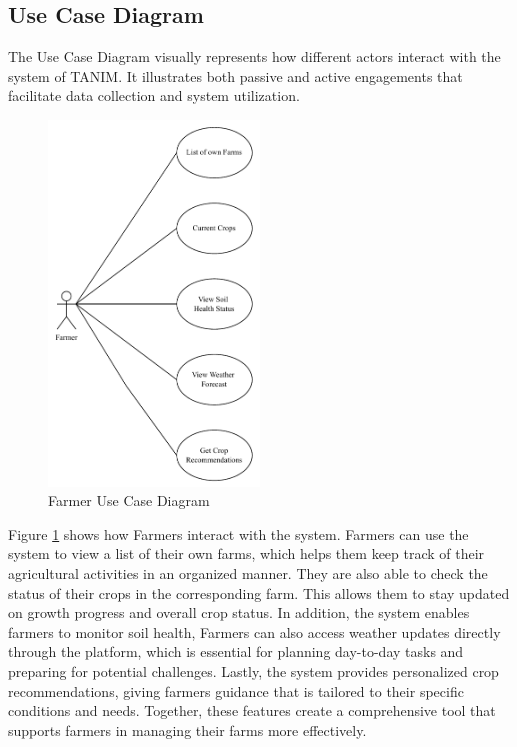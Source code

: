 {	\subsection{Use Case Diagram}
	The Use Case Diagram visually represents how different actors interact with the system of TANIM. It illustrates both passive and active engagements that facilitate data collection and system utilization.
	
	\begin{figure}[H]
		\centering
		\caption{Farmer Use Case Diagram}
		\label{fig:FarmerUseCase}
		\includegraphics[width=0.5\textwidth]{figures/FarmerUseCase.pdf}
	\end{figure}
	
	Figure \ref{fig:FarmerUseCase} shows how Farmers interact with the system. Farmers can use the system to view a list of their own farms, which helps them keep track of their agricultural activities in an organized manner. They are also able to check the status of their crops in the corresponding farm. This allows them to stay updated on growth progress and overall crop status. In addition, the system enables farmers to monitor soil health, Farmers can also access weather updates directly through the platform, which is essential for planning day-to-day tasks and preparing for potential challenges. Lastly, the system provides personalized crop recommendations, giving farmers guidance that is tailored to their specific conditions and needs. Together, these features create a comprehensive tool that supports farmers in managing their farms more effectively.
	
}
